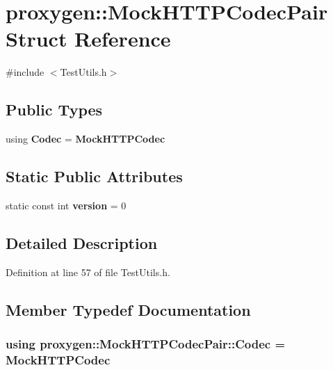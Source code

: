 \section{proxygen\+:\+:Mock\+H\+T\+T\+P\+Codec\+Pair Struct Reference}
\label{structproxygen_1_1MockHTTPCodecPair}


{\ttfamily \#include $<$Test\+Utils.\+h$>$}

\subsection*{Public Types}
\begin{DoxyCompactItemize}
\item 
using {\bf Codec} = {\bf Mock\+H\+T\+T\+P\+Codec}
\end{DoxyCompactItemize}
\subsection*{Static Public Attributes}
\begin{DoxyCompactItemize}
\item 
static const int {\bf version} = 0
\end{DoxyCompactItemize}


\subsection{Detailed Description}


Definition at line 57 of file Test\+Utils.\+h.



\subsection{Member Typedef Documentation}
\subsubsection[{Codec}]{\setlength{\rightskip}{0pt plus 5cm}using {\bf proxygen\+::\+Mock\+H\+T\+T\+P\+Codec\+Pair\+::\+Codec} =  {\bf Mock\+H\+T\+T\+P\+Codec}}\label{structproxygen_1_1MockHTTPCodecPair_a1731fe059a4895b49ac40d7bf8323394}


